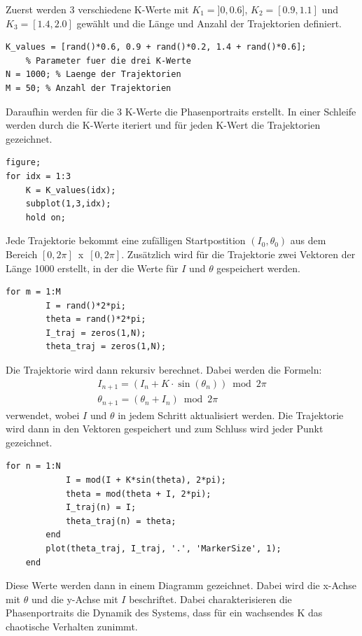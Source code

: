 \documentclass[paper=a4, 
                DIV=12]{scrartcl}
\begin{document}
\noindent Zuerst werden 3 verschiedene K-Werte mit $K_{1} = ]0,0.6]$, $K_{2} = [0.9,1.1]$ und \hbox{$K_{3} = [1.4,2.0]$} gewählt und die Länge und Anzahl der Trajektorien definiert. 
\begin{lstlisting}[frame=single, style=Matlab-editor]
K_values = [rand()*0.6, 0.9 + rand()*0.2, 1.4 + rand()*0.6];
    % Parameter fuer die drei K-Werte
N = 1000; % Laenge der Trajektorien
M = 50; % Anzahl der Trajektorien
\end{lstlisting}
Daraufhin werden für die 3 K-Werte die Phasenportraits erstellt. In einer Schleife werden durch die K-Werte iteriert und für jeden K-Wert die Trajektorien gezeichnet.
\begin{lstlisting}[frame=single, style=Matlab-editor]
figure;
for idx = 1:3
    K = K_values(idx);
    subplot(1,3,idx);
    hold on;
\end{lstlisting}
Jede Trajektorie bekommt eine zufälligen Startpostition $(I_0, \theta_0)$ aus dem Bereich \hbox{$[0,2\pi]$ x $[0,2\pi]$}.
Zusätzlich wird für die Trajektorie zwei Vektoren der Länge 1000 erstellt, in der die Werte für $I$ und $\theta$ gespeichert werden.
\begin{lstlisting}[frame=single, style=Matlab-editor]
    for m = 1:M
        I = rand()*2*pi;
        theta = rand()*2*pi;
        I_traj = zeros(1,N);
        theta_traj = zeros(1,N);
\end{lstlisting}
Die Trajektorie wird dann rekursiv berechnet. Dabei werden die Formeln:
\begin{gather*}
    I_{n+1} = (I_n + K \cdot \sin(\theta_n)) \bmod 2\pi \\
    \theta_{n+1} = (\theta_n + I_n) \bmod 2\pi
\end{gather*}
verwendet, wobei $I$ und $\theta$ in jedem Schritt aktualisiert werden. Die Trajektorie wird dann in den Vektoren gespeichert und zum Schluss wird jeder Punkt gezeichnet.
\newpage
\begin{lstlisting}[frame=single, style=Matlab-editor]
        for n = 1:N
            I = mod(I + K*sin(theta), 2*pi);
            theta = mod(theta + I, 2*pi);
            I_traj(n) = I;
            theta_traj(n) = theta;
        end
        plot(theta_traj, I_traj, '.', 'MarkerSize', 1);
    end
\end{lstlisting}
Diese Werte werden dann in einem Diagramm gezeichnet. Dabei wird die x-Achse mit $\theta$ und die y-Achse mit $I$ beschriftet.
\noindent Dabei charakterisieren die Phasenportraits die Dynamik des Systems, dass für ein wachsendes K das chaotische Verhalten zunimmt. \\
\end{document}

